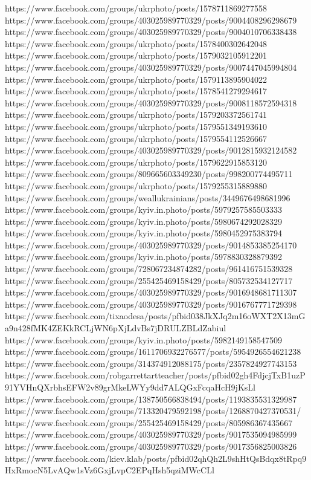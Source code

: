 https://www.facebook.com/groups/ukrphoto/posts/1578711869277558
https://www.facebook.com/groups/403025989770329/posts/9004408296298679
https://www.facebook.com/groups/403025989770329/posts/9004010706338438
https://www.facebook.com/groups/ukrphoto/posts/1578400302642048
https://www.facebook.com/groups/ukrphoto/posts/1579032105912201
https://www.facebook.com/groups/403025989770329/posts/9007447045994804
https://www.facebook.com/groups/ukrphoto/posts/1579113895904022
https://www.facebook.com/groups/ukrphoto/posts/1578541279294617
https://www.facebook.com/groups/403025989770329/posts/9008118572594318
https://www.facebook.com/groups/ukrphoto/posts/1579203372561741
https://www.facebook.com/groups/ukrphoto/posts/1579551349193610
https://www.facebook.com/groups/ukrphoto/posts/1579554112526667
https://www.facebook.com/groups/403025989770329/posts/9012815932124582
https://www.facebook.com/groups/ukrphoto/posts/1579622915853120
https://www.facebook.com/groups/809665603349230/posts/998200774495711
https://www.facebook.com/groups/ukrphoto/posts/1579255315889880
https://www.facebook.com/groups/weallukrainians/posts/3449676498681996
https://www.facebook.com/groups/kyiv.in.photo/posts/5979257585503333
https://www.facebook.com/groups/kyiv.in.photo/posts/5980674292028329
https://www.facebook.com/groups/kyiv.in.photo/posts/5980452975383794
https://www.facebook.com/groups/403025989770329/posts/9014853385254170
https://www.facebook.com/groups/kyiv.in.photo/posts/5978830328879392
https://www.facebook.com/groups/728067234874282/posts/961416751539328
https://www.facebook.com/groups/255425469158429/posts/805732534127717
https://www.facebook.com/groups/403025989770329/posts/9016948681711307
https://www.facebook.com/groups/403025989770329/posts/9016767771729398
https://www.facebook.com/tixaodesa/posts/pfbid038JkXJq2m16oWXT2X13mGa9n428fMK4ZEKkRCLjWN6pXjLdvBs7jDRULZBLdZabiul
https://www.facebook.com/groups/kyiv.in.photo/posts/5982149158547509
https://www.facebook.com/groups/1611706932276577/posts/5954926554621238
https://www.facebook.com/groups/314374912088175/posts/2357824927743153
https://www.facebook.com/robgarrettartteacher/posts/pfbid02gh4FdjcjTxB1uzP91YVHnQXrbhsEFW2v89grMkeLWYy9dd7ALQGxFcqaHcH9jKsLl
https://www.facebook.com/groups/138750566838494/posts/1193835531329987
https://www.facebook.com/groups/713320479592198/posts/1268870427370531/
https://www.facebook.com/groups/255425469158429/posts/805986367435667
https://www.facebook.com/groups/403025989770329/posts/9017535094985999
https://www.facebook.com/groups/403025989770329/posts/9017356825003826
https://www.facebook.com/kiev.klab/posts/pfbid02qhQh2L9shHtQsBdqx8tRpq9HxRmocN5LvAQw1sVz6GxjLvpC2EPqHsh5qziMWcCLl
